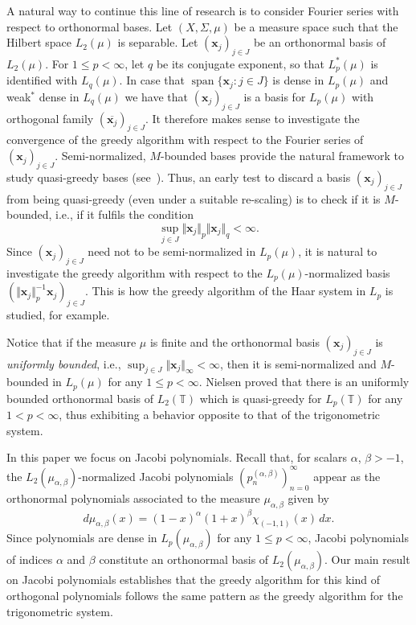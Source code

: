 \documentclass[11pt, leqno]{amsart}
\theoremstyle{remark}
\numberwithin{equation}{section}
\newcommand{\TT}{\ensuremath{\mathbb{T}}}
\newcommand{\xx}{\ensuremath{\mathbf{x}}}
\newcommand{\spn}{\operatorname{span}}
\begin{document}
A natural way to continue this line of research is to consider Fourier series with respect to orthonormal bases. Let $(X,\Sigma,\mu)$ be a measure space such that the Hilbert space $L_2(\mu)$ is separable. Let
$(\xx_j)_{j\in J}$ be an orthonormal basis of $L_2(\mu)$.
For $1\le p< \infty$, let $q$ be its conjugate exponent, so that 
$L_p^*(\mu)$ is identified with $L_q(\mu)$.
In case that  $\spn \{ \xx_j : j\in J\}$ is dense in $L_p(\mu)$ and 
 weak${}^*$ dense in $L_q(\mu)$
we have that $(\xx_j)_{j\in J}$ is a basis for $L_p(\mu)$ with orthogonal family 
$(\overline{\xx_j})_{j\in J}$.
 It therefore makes sense to investigate the convergence of the greedy algorithm with respect to the Fourier series of $(\xx_j)_{j\in J}$.
Semi-normalized, $M$-bounded bases provide the natural framework to study quasi-greedy bases (see~\cite{Wo2000}).
Thus, an early test to discard a  basis $(\xx_j)_{j\in J}$ from being quasi-greedy (even under a suitable re-scaling) is to check if it is $M$-bounded, i.e., if it  fulfils the condition
\begin{equation}
\label{EarlyTest}
\sup_{j\in J} \Vert \xx_j \Vert_p \Vert \xx_j \Vert_q<\infty.
\end{equation}
Since  $(\xx_j)_{j\in J}$ need not to be semi-normalized in $L_p(\mu)$, 
it is natural to investigate the greedy algorithm with respect to the $L_p(\mu)$-normalized basis 
$(\Vert \xx_j\Vert_p^{-1} \xx_j)_{j\in J}$. This is how the greedy algorithm of the Haar system in $L_p$ is studied, for example.
 

Notice that if the measure $\mu$ is finite and the orthonormal basis $(\xx_j)_{j\in J}$
is \textit{uniformly bounded}, i.e., $\sup_{j\in J} \Vert \xx_j\Vert_\infty<\infty$, then it is semi-normalized and $M$-bounded in $L_p(\mu)$ for any $1\le p<\infty$.
Nielsen \cite{Nielsen2007} proved that there is an uniformly bounded orthonormal basis of $L_2(\TT)$ which is quasi-greedy for $L_p(\TT)$ for any $1<p<\infty$, thus
exhibiting a behavior opposite to that of the trigonometric system.

In this paper we focus on Jacobi polynomials.
Recall that, for  scalars $\alpha$, $\beta>-1$, the  $L_2(\mu_{\alpha,\beta})$-normalized Jacobi polynomials
$(p_n^{(\alpha,\beta)})_{n=0}^\infty$ appear as the orthonormal polynomials associated to the measure $\mu_{\alpha,\beta}$ given by
\begin{equation}
\label{measureJacobi}
d\mu_{\alpha,\beta}(x)=(1-x)^\alpha (1+x)^\beta \chi_{(-1,1)} (x) \, dx.
\end{equation}
Since polynomials are dense in $L_p(\mu_{\alpha,\beta})$ for any $1\le p<\infty$, Jacobi polynomials of indices $\alpha$ and $\beta$ constitute an orthonormal basis of $L_2(\mu_{\alpha,\beta})$. Our main result on Jacobi polynomials establishes that the greedy algorithm for this kind of orthogonal polynomials follows the same pattern as the greedy algorithm for the trigonometric system.
\end{document}

